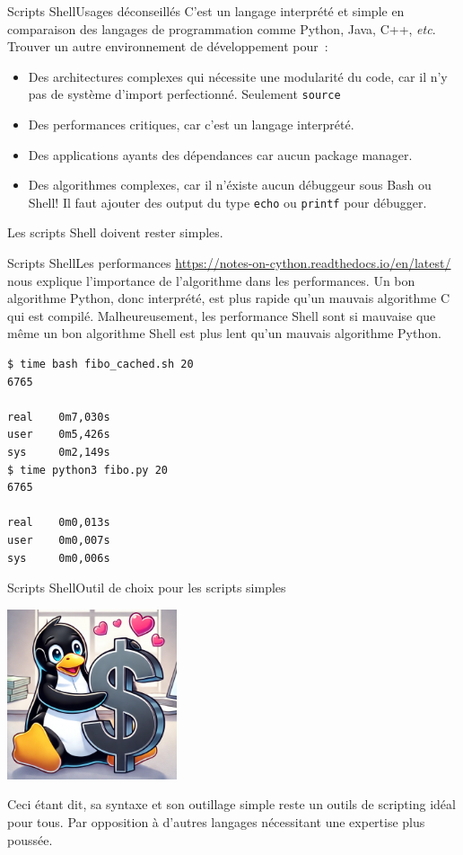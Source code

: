 \documentclass{beamer}
\begin{document}
    \begin{frame}{Scripts Shell}{Usages déconseillés}
        C'est un langage interprété et simple en comparaison des langages de programmation comme Python, Java, C++, \textit{etc}.
        Trouver un autre environnement de développement pour~:
        \begin{itemize}
            \item Des architectures complexes qui nécessite une modularité du code, car il n'y pas de système d'import perfectionné.
            Seulement \lstinline{source}
            \item Des performances critiques, car c'est un langage interprété.
            \item Des applications ayants des dépendances car aucun package manager.
            \item Des algorithmes complexes, car il n'éxiste aucun débuggeur sous Bash ou Shell!
            Il faut ajouter des output du type \lstinline{echo} ou \lstinline{printf} pour débugger.
        \end{itemize}
        \bigbreak
        Les scripts Shell doivent rester simples.
    \end{frame}

    \begin{frame}[fragile]{Scripts Shell}{Les performances}
        \url{https://notes-on-cython.readthedocs.io/en/latest/} nous explique l'importance de l'algorithme dans les performances.
        Un bon algorithme Python, donc interprété, est plus rapide qu'un mauvais algorithme C qui est compilé.
        \bigbreak
        Malheureusement, les performance Shell sont si mauvaise que même un bon algorithme Shell est plus lent qu'un mauvais algorithme Python.
        \begin{lstlisting}[language=bash]
$ time bash fibo_cached.sh 20
6765

real    0m7,030s
user    0m5,426s
sys     0m2,149s
$ time python3 fibo.py 20
6765

real    0m0,013s
user    0m0,007s
sys     0m0,006s
        \end{lstlisting}
    \end{frame}

    \begin{frame}{Scripts Shell}{Outil de choix pour les scripts simples}
        \begin{center}
            \includegraphics[width=5cm]{image/pinguin-hugging-shell}
        \end{center}
        Ceci étant dit, sa syntaxe et son outillage simple reste un outils de scripting idéal pour tous.
        Par opposition à d'autres langages nécessitant une expertise plus poussée.
    \end{frame}
\end{document}
